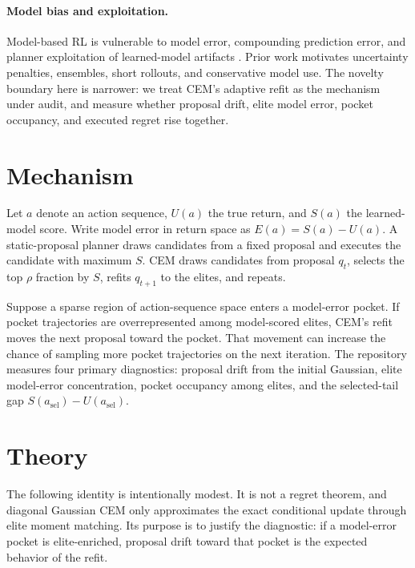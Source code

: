 \documentclass{article}
\newcommand{\pocket}{model-error pocket}
\begin{document}
\paragraph{Model bias and exploitation.}
Model-based RL is vulnerable to model error, compounding prediction error, and planner exploitation of learned-model artifacts \citep{talvitie2014model,janner2019mbpo}. Prior work motivates uncertainty penalties, ensembles, short rollouts, and conservative model use. The novelty boundary here is narrower: we treat CEM's adaptive refit as the mechanism under audit, and measure whether proposal drift, elite model error, pocket occupancy, and executed regret rise together.

\section{Mechanism}

Let $a$ denote an action sequence, $U(a)$ the true return, and $S(a)$ the learned-model score. Write model error in return space as $E(a)=S(a)-U(a)$. A static-proposal planner draws candidates from a fixed proposal and executes the candidate with maximum $S$. CEM draws candidates from proposal $q_t$, selects the top $\rho$ fraction by $S$, refits $q_{t+1}$ to the elites, and repeats.

Suppose a sparse region of action-sequence space enters a \pocket{}. If pocket trajectories are overrepresented among model-scored elites, CEM's refit moves the next proposal toward the pocket. That movement can increase the chance of sampling more pocket trajectories on the next iteration. The repository measures four primary diagnostics: proposal drift from the initial Gaussian, elite model-error concentration, pocket occupancy among elites, and the selected-tail gap $S(a_{\mathrm{sel}})-U(a_{\mathrm{sel}})$.

\section{Theory}

The following identity is intentionally modest. It is not a regret theorem, and diagonal Gaussian CEM only approximates the exact conditional update through elite moment matching. Its purpose is to justify the diagnostic: if a model-error pocket is elite-enriched, proposal drift toward that pocket is the expected behavior of the refit.
\end{document}
